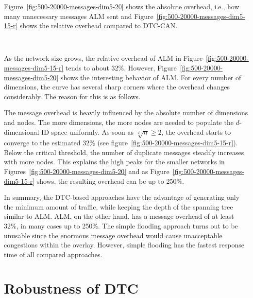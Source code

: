 \documentclass[fleqn,12pt,twoside]{article}
\begin{document}
Figure~\ref{fig:500-20000-messages-dim5-20} shows the absolute
overhead, i.e., how many unnecessary messages ALM sent and
Figure~\ref{fig:500-20000-messages-dim5-15-r} shows the relative
overhead compared to DTC-CAN.



\begin{figure*}[!tb]
  \centering
  \mbox{
    \quad
    }
\end{figure*}



As the network size grows, the relative overhead of ALM in
Figure~\ref{fig:500-20000-messages-dim5-15-r} tends to about
32\%. However, Figure~\ref{fig:500-20000-messages-dim5-20} shows the
interesting behavior of ALM. For every number of dimensions, the curve
has several sharp corners where the overhead changes considerably. The
reason for this is as follows. 

The message overhead is heavily influenced by the absolute number of
dimensions and nodes. The more dimensions, the more nodes are needed
to populate the $d$-dimensional ID space uniformly. As soon as
$\sqrt[d]{n}\ge 2$, the overhead starts to converge to the estimated
32\% (see figure~\ref{fig:500-20000-messages-dim5-15-r}). Below the
critical threshold, the number of duplicate messages steadily
increases with more nodes. This explains the high peaks for the
smaller networks in Figures~\ref{fig:500-20000-messages-dim5-20} and
as Figure~\ref{fig:500-20000-messages-dim5-15-r} shows, the resulting
overhead can be up to 250\%.

In summary, the DTC-based approaches have the advantage of generating
only the minimum amount of traffic, while keeping the depth of the
spanning tree similar to ALM. ALM, on the other hand, has a message
overhead of at least 32\%, in many cases up to 250\%. The simple
flooding approach turns out to be unusable since the enormous message
overhead would cause unacceptable congestions within the overlay.
However, simple flooding has the fastest response time of all compared
approaches.


\section{Robustness of DTC}
\label{sec:robustness-security}
\end{document}
